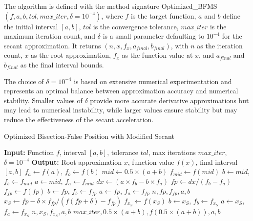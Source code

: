 \documentclass[amsmath, amssymb, aps]{revtex4-2}
\begin{document}
The algorithm is defined with the method signature Optimized\_BFMS$(f, a, b, tol, max\_iter, \delta = 10^{-4})$, where $f$ is the target function, $a$ and $b$ define the initial interval $[a, b]$, $tol$ is the convergence tolerance, $max\_iter$ is the maximum iteration count, and $\delta$ is a small parameter defaulting to $10^{-4}$ for the secant approximation. It returns $(n, x, f_x, a_{final}, b_{final})$, with $n$ as the iteration count, $x$ as the root approximation, $f_x$ as the function value at $x$, and $a_{final}$ and $b_{final}$ as the final interval bounds.

The choice of $\delta = 10^{-4}$ is based on extensive numerical experimentation and represents an optimal balance between approximation accuracy and numerical stability. Smaller values of $\delta$ provide more accurate derivative approximations but may lead to numerical instability, while larger values ensure stability but may reduce the effectiveness of the secant acceleration.

\begin{algorithm}[H]
\caption{ Optimized Bisection-False Position with Modified Secant}
\begin{algorithmic}[1]
\State \textbf{Input:} Function $f$, interval $[a, b]$, tolerance $tol$, max iterations $max\_iter$, $\delta = 10^{-4}$
\State \textbf{Output:} Root approximation $x$, function value $f(x)$, final interval $[a, b]$
\State $f_a \gets f(a)$, $f_b \gets f(b)$
    \State $mid \gets 0.5 \times (a + b)$
    \State $f_{mid} \gets f(mid)$
        \State $b \gets mid$, $f_b \gets f_{mid}$
    \Else
        \State $a \gets mid$, $f_a \gets f_{mid}$
    \EndIf
    \State $dx \gets (a \times f_b - b \times f_a)$
    \State $fp \gets dx / (f_b - f_a)$
    \State $f_{fp} \gets f(fp)$
        \State $b \gets fp$, $f_b \gets f_{fp}$
    \Else
        \State $a \gets fp$, $f_a \gets f_{fp}$
    \EndIf
        \State \Return $n, fp, f_{fp}, a, b$
    \EndIf
    \State $x_S \gets fp - \delta \times f_{fp} / (f(fp + \delta) - f_{fp})$
        \State $f_{x_S} \gets f(x_S)$
                \State $b \gets x_S$, $f_b \gets f_{x_S}$
            \Else
                \State $a \gets x_S$, $f_a \gets f_{x_S}$
            \EndIf
                \State \Return $n, x_S, f_{x_S}, a, b$
            \EndIf
        \EndIf
    \EndIf
\EndFor
\State \Return $max\_iter, 0.5 \times (a + b), f(0.5 \times (a + b)), a, b$
\end{algorithmic}
\end{algorithm}
\end{document}
